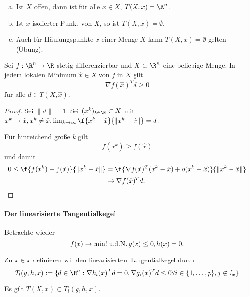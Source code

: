 \begin{ex} \label{3.14}
	\begin{enumerate}[(a)]
		\item
			Ist $X$ offen, dann ist für alle $x \in X$, $T(X, x) = \R^n$.
		\item
			Ist $x$ isolierter Punkt von $X$, so ist $T(X, x) = \emptyset$.
		\item
			Auch für Häufungspunkte $x$ einer Menge $X$ kann $T(X, x) = \emptyset$ gelten (Übung).
	\end{enumerate}
\end{ex}

\begin{st} \label{3.15}
	Sei $f: \R^n \to \R$ stetig differenzierbar und $X \subset \R^n$ eine beliebige Menge.
	In jedem lokalen Minimum $\hat x \in X$ von $f$ in $X$ gilt
	\[
		\nabla f(\hat x)^T d \ge 0
	\]
	für alle $d \in T(X, \hat x)$.
	\begin{proof}
		Sei \oBdA $\|d\| = 1$.
		Sei $(x^k)_{k\in\N} \subset X$ mit $x^k \to \hat x, x^k \neq \hat x, \lim_{k\to \infty} \f{x^k-\hat x}{\|x^k - \hat x\|} = d$.

		Für hinreichend große $k$ gilt
		\[
			f(x^k) \ge f(\hat x)
		\]
		und damit
		\begin{align*}
			0 \le \f {f(x^k) - f(\hat x)}{\|x^k - \hat x\|}
			&= \f{\nabla f(\hat x)^T (x^k - \hat x) + o(x^k - \hat x)}{\|x^k - \hat x\|} \\
			&\to \nabla f(\hat x)^T d.
		\end{align*}
	\end{proof}
\end{st}

\paragraph{Der linearisierte Tangentialkegel}

Betrachte wieder
\[
	f(x) \to \min! \;\text{u.d.N.}\, g(x) \le 0, h(x) = 0.
\]

\begin{df} \label{3.16}
	Zu $x \in x$ definieren wir den linearisierten Tangentialkegel durch
	\[
		T_l(g,h,x) := \{d \in \R^n : \nabla h_i(x)^T d = 0, \nabla g_i(x)^T d \le 0 \forall i \in \{1,\dotsc,p\}, j \not\in I_x \}
	\]
\end{df}

\begin{lem} \label{3.17}
	Es gilt $T(X, x) \subset T_l(g,h,x)$.
\end{lem}


